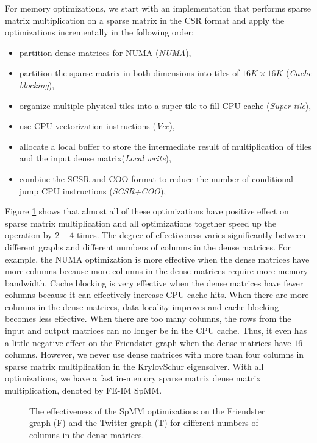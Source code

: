 For memory optimizations, we start with an implementation that performs sparse
matrix multiplication on a sparse matrix in the CSR format and apply
the optimizations incrementally in the following order:
\begin{itemize} \itemsep1pt \parskip0pt 
		\item partition dense matrices for NUMA (\textit{NUMA}),
	\item partition the sparse matrix in both dimensions into tiles of
		$16K \times 16K$ (\textit{Cache blocking}),
	\item organize multiple physical tiles into a super tile to fill CPU cache
		(\textit{Super tile}),
	\item use CPU vectorization instructions (\textit{Vec}),
	\item allocate a local buffer to store the intermediate result of
		multiplication of tiles and the input dense matrix(\textit{Local write}),
	\item combine the SCSR and COO format to reduce the number of conditional
		jump CPU instructions (\textit{SCSR+COO}),
\end{itemize}

Figure \ref{perf:spmm_opt} shows that almost all of these optimizations have
positive effect on sparse matrix multiplication and all optimizations
together speed up the operation by $2-4$ times.
The degree of effectiveness varies
significantly between different graphs and different numbers of columns in
the dense matrices. For example, the NUMA optimization is more effective when
the dense matrices have more columns because more columns in the dense matrices
require more memory bandwidth. Cache blocking is very effective when
the dense matrices have fewer columns because it can effectively increase CPU
cache hits. When there are more columns in the dense matrices, data locality
improves and cache blocking becomes less effective. When there are too many
columns, the rows from
the input and output matrices can no longer be in the CPU cache. Thus, it even
has a little negative effect on the Friendster graph when the dense matrices
have $16$ columns. However, we never use dense matrices with more than four
columns in sparse matrix multiplication in the KrylovSchur eigensolver.
With all optimizations, we have a fast in-memory sparse matrix dense matrix
multiplication, denoted by FE-IM SpMM.

\begin{figure}
	\begin{center}
		\footnotesize
		\vspace{-15pt}
		
		\vspace{-15pt}
		\caption{The effectiveness of the SpMM optimizations on the Friendster
			graph (F) and the Twitter graph (T) for different numbers of
			columns in the dense matrices.}
		\label{perf:spmm_opt}
	\end{center}
\end{figure}

